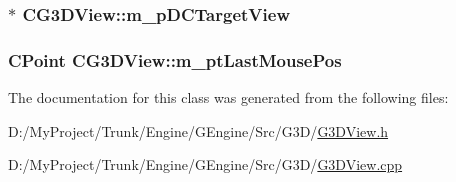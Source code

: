 \subsubsection[{m\+\_\+p\+D\+C\+Target\+View}]{$\ast$ C\+G3\+D\+View\+::m\+\_\+p\+D\+C\+Target\+View\hspace{0.3cm}{\ttfamily [protected]}}\label{class_c_g3_d_view_a4e9001b00d6f9318c41cfc4536a7c34c}
\hypertarget{class_c_g3_d_view_aeac573889f9cd92ce742290fbd3aa810}{}
\subsubsection[{m\+\_\+pt\+Last\+Mouse\+Pos}]{\setlength{\rightskip}{0pt plus 5cm}C\+Point C\+G3\+D\+View\+::m\+\_\+pt\+Last\+Mouse\+Pos\hspace{0.3cm}{\ttfamily [protected]}}\label{class_c_g3_d_view_aeac573889f9cd92ce742290fbd3aa810}


The documentation for this class was generated from the following files\+:\begin{DoxyCompactItemize}
\item 
D\+:/\+My\+Project/\+Trunk/\+Engine/\+G\+Engine/\+Src/\+G3\+D/\hyperlink{_g3_d_view_8h}{G3\+D\+View.\+h}\item 
D\+:/\+My\+Project/\+Trunk/\+Engine/\+G\+Engine/\+Src/\+G3\+D/\hyperlink{_g3_d_view_8cpp}{G3\+D\+View.\+cpp}\end{DoxyCompactItemize}

